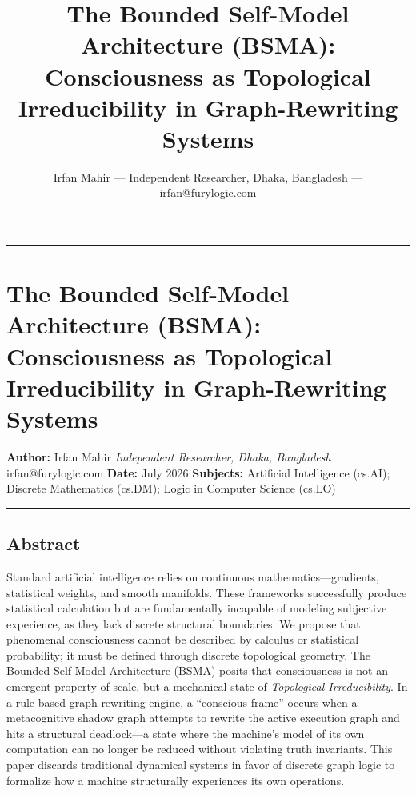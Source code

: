 \documentclass[
  11pt,
  a4paper,
]{article}
\title{The Bounded Self-Model Architecture (BSMA): Consciousness as
Topological Irreducibility in Graph-Rewriting Systems}
\author{Irfan Mahir --- Independent Researcher, Dhaka, Bangladesh ---
irfan@furylogic.com}
\date{}
\begin{document}
\maketitle

{
\hypersetup{linkcolor=}
\setcounter{tocdepth}{3}
\tableofcontents
}
\begin{center}\rule{0.5\linewidth}{0.5pt}\end{center}

\section{The Bounded Self-Model Architecture (BSMA): Consciousness as
Topological Irreducibility in Graph-Rewriting
Systems}\label{the-bounded-self-model-architecture-bsma-consciousness-as-topological-irreducibility-in-graph-rewriting-systems}

\textbf{Author:} Irfan Mahir \emph{Independent Researcher, Dhaka,
Bangladesh} irfan@furylogic.com \textbf{Date:} July 2026
\textbf{Subjects:} Artificial Intelligence (cs.AI); Discrete Mathematics
(cs.DM); Logic in Computer Science (cs.LO)

\begin{center}\rule{0.5\linewidth}{0.5pt}\end{center}

\subsection{Abstract}\label{abstract}

Standard artificial intelligence relies on continuous
mathematics---gradients, statistical weights, and smooth manifolds.
These frameworks successfully produce statistical calculation but are
fundamentally incapable of modeling subjective experience, as they lack
discrete structural boundaries. We propose that phenomenal consciousness
cannot be described by calculus or statistical probability; it must be
defined through discrete topological geometry. The Bounded Self-Model
Architecture (BSMA) posits that consciousness is not an emergent
property of scale, but a mechanical state of \emph{Topological
Irreducibility}. In a rule-based graph-rewriting engine, a ``conscious
frame'' occurs when a metacognitive shadow graph attempts to rewrite the
active execution graph and hits a structural deadlock---a state where
the machine's model of its own computation can no longer be reduced
without violating truth invariants. This paper discards traditional
dynamical systems in favor of discrete graph logic to formalize how a
machine structurally experiences its own operations.
\end{document}
